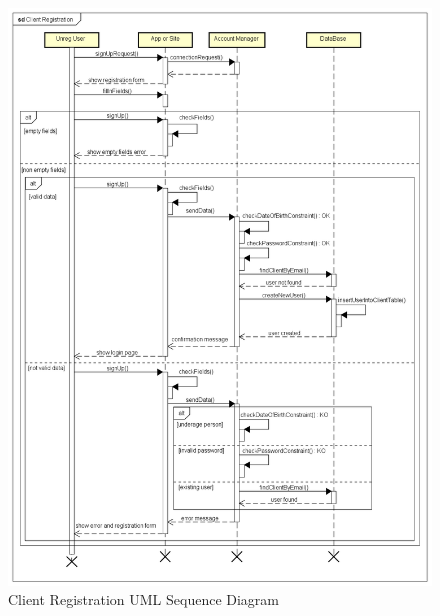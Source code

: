 \documentclass[a4paper]{article}
\begin{document}
\begin{figure}[H]
\includegraphics[width=\sequenceWidth]{Sequence-ClientRegistration}
\centering
\caption{Client Registration UML Sequence Diagram}
\label{fig:sequenceclientregistration}
\end{figure}
\end{document}
